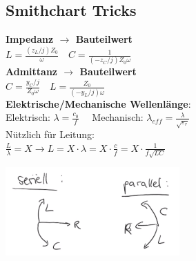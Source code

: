 \documentclass[english]{latex4ei/latex4ei_sheet}
\begin{document}
\begin{sectionbox}
    \subsection{Smithchart Tricks}

    \textbf{Impedanz $\rightarrow$ Bauteilwert}\\
    $L=\frac{(z_L / j)Z_0}{\omega} \quad C=\frac{1}{(-z_C / j)Z_0\omega}$\\
    \textbf{Admittanz $\rightarrow$ Bauteilwert}\\
    $C=\frac{y_C / j}{Z_0 \omega} \quad L = \frac{Z_0}{(-y_L / j) \omega}$\\
    \textbf{Elektrische/Mechanische Wellenlänge}:\\
    Elektrisch: $\lambda = \frac{c_0}{f}\quad$ Mechanisch: $\lambda_{eff} = \frac{\lambda}{\sqrt{\varepsilon_r}}$ \\
    Nützlich für Leitung:\\
    $\frac{L}{\lambda}=X \rightarrow L = X \cdot \lambda = X \cdot \frac{c}{f} = X \cdot \frac{1}{f\sqrt{LC}}$
    \begin{center}\includegraphics[width = 0.5\textwidth]{./img/smith_para_serie.png}\end{center}

\end{sectionbox}
\end{document}

